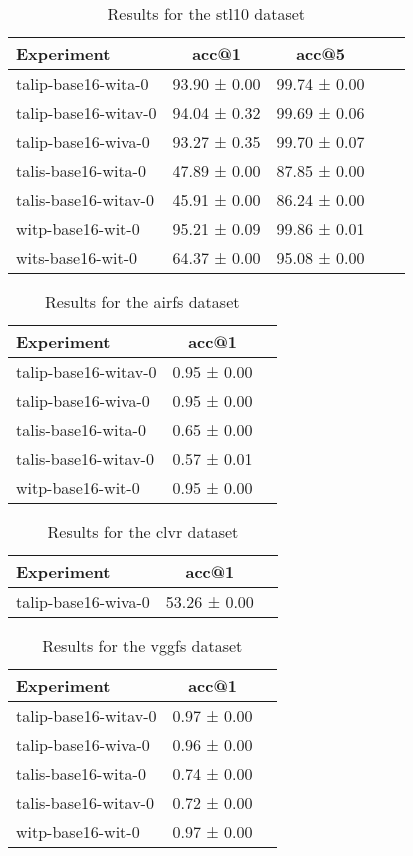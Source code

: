 \begin{table}[htbp]
\caption{Results for the stl10 dataset}
\begin{tabular}{|l|c|c|c|c|}\hline
Experiment & acc@1 & acc@5\\
\hline
talip-base16-wita-0 & 93.90 ± 0.00 & 99.74 ± 0.00\\
\hline
talip-base16-witav-0 & 94.04 ± 0.32 & 99.69 ± 0.06\\
\hline
talip-base16-wiva-0 & 93.27 ± 0.35 & 99.70 ± 0.07\\
\hline
talis-base16-wita-0 & 47.89 ± 0.00 & 87.85 ± 0.00\\
\hline
talis-base16-witav-0 & 45.91 ± 0.00 & 86.24 ± 0.00\\
\hline
witp-base16-wit-0 & 95.21 ± 0.09 & 99.86 ± 0.01\\
\hline
wits-base16-wit-0 & 64.37 ± 0.00 & 95.08 ± 0.00\\
\hline
\end{tabular}
\end{table}

\begin{table}[htbp]
\caption{Results for the airfs dataset}
\begin{tabular}{|l|c|c|}\hline
Experiment & acc@1\\
\hline
talip-base16-witav-0 & 0.95 ± 0.00\\
\hline
talip-base16-wiva-0 & 0.95 ± 0.00\\
\hline
talis-base16-wita-0 & 0.65 ± 0.00\\
\hline
talis-base16-witav-0 & 0.57 ± 0.01\\
\hline
witp-base16-wit-0 & 0.95 ± 0.00\\
\hline
\end{tabular}
\end{table}

\begin{table}[htbp]
\caption{Results for the clvr dataset}
\begin{tabular}{|l|c|c|}\hline
Experiment & acc@1\\
\hline
talip-base16-wiva-0 & 53.26 ± 0.00\\
\hline
\end{tabular}
\end{table}

\begin{table}[htbp]
\caption{Results for the vggfs dataset}
\begin{tabular}{|l|c|c|}\hline
Experiment & acc@1\\
\hline
talip-base16-witav-0 & 0.97 ± 0.00\\
\hline
talip-base16-wiva-0 & 0.96 ± 0.00\\
\hline
talis-base16-wita-0 & 0.74 ± 0.00\\
\hline
talis-base16-witav-0 & 0.72 ± 0.00\\
\hline
witp-base16-wit-0 & 0.97 ± 0.00\\
\hline
\end{tabular}
\end{table}

